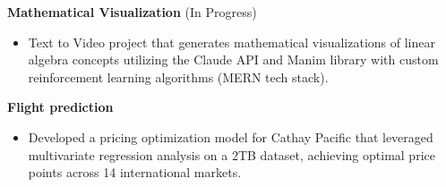 \documentclass{article}
\begin{document}
\textbf{Mathematical Visualization} (In Progress)
\begin{itemize}[leftmargin=*, noitemsep]
    \item Text to Video project that generates mathematical visualizations of linear algebra concepts utilizing the Claude API and Manim library with custom reinforcement learning algorithms (MERN tech stack).
\end{itemize}

\textbf{Flight prediction}
\begin{itemize}[leftmargin=*, noitemsep]
    \item Developed a pricing optimization model for Cathay Pacific that leveraged multivariate regression analysis on a 2TB dataset, achieving optimal price points across 14 international markets.
\end{itemize}
\end{document}
